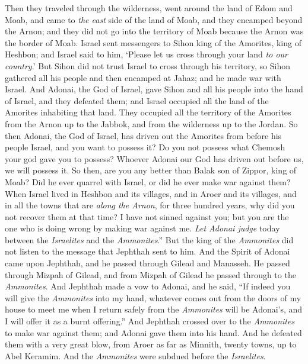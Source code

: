 \begin{biblechapter}
\verse Then they traveled through the wilderness, went around the land of Edom and Moab, and came to \textit{the east} side of the land of Moab, and they encamped beyond the Arnon; and they did not go into the territory of Moab because the Arnon was the border of Moab.
\verse Israel sent messengers to Sihon king of the Amorites, king of Heshbon; and Israel said to him, ‘Please let us cross through your land \textit{to our country}.’
\verse But Sihon did not trust Israel to cross through his territory, so Sihon gathered all his people and then encamped at Jahaz; and he made war with Israel.
\verse And Adonai, the God of Israel, gave Sihon and all his people into the hand of Israel, and they defeated them; and Israel occupied all the land of the Amorites inhabiting that land.
\verse They occupied all the territory of the Amorites from the Arnon up to the Jabbok, and from the wilderness up to the Jordan.
\verse So then Adonai, the God of Israel, has driven out the Amorites from before his people Israel, and you want to possess it?
\verse Do you not possess what Chemosh your god gave you to possess? Whoever Adonai our God has driven out before us, we will possess it.
\verse So then, are you any better than Balak son of Zippor, king of Moab? Did he ever quarrel with Israel, or did he ever make war against them?
\verse When Israel lived in Heshbon and its villages, and in Aroer and its villages, and in all the towns that are \textit{along the Arnon}, for three hundred years, why did you not recover them at that time?
\verse I have not sinned against you; but you are the one who is doing wrong by making war against me. \textit{Let Adonai judge} today between the \textit{Israelites} and the \textit{Ammonites}.”
\verse But the king of the \textit{Ammonites} did not listen to the message that Jephthah sent to him.
 And the Spirit of Adonai came upon Jephthah, and he passed through Gilead and Manasseh. He passed through Mizpah of Gilead, and from Mizpah of Gilead he passed through to the \textit{Ammonites}.
\verse And Jephthah made a vow to Adonai, and he said, “If indeed you will give the \textit{Ammonites} into my hand,
\verse whatever comes out from the doors of my house to meet me when I return safely from the \textit{Ammonites} will be Adonai’s, and I will offer it as a burnt offering.”
\verse And Jephthah crossed over to the \textit{Ammonites} to make war against them; and Adonai gave them into his hand.
\verse And he defeated them with a very great blow, from Aroer as far as Minnith, twenty towns, up to Abel Keramim. And the \textit{Ammonites} were subdued before the \textit{Israelites}.

\end{biblechapter}
